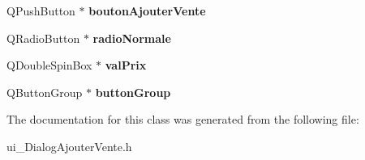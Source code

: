 \begin{DoxyCompactItemize}
\item 
Q\-Push\-Button $\ast$ {\bfseries bouton\-Ajouter\-Vente}\label{class_ui___dialog_ajouter_vente_a9b3dc0fa96393ccf69a41ae7776da8df}

\item 
Q\-Radio\-Button $\ast$ {\bfseries radio\-Normale}\label{class_ui___dialog_ajouter_vente_a4ec0099d5d75035625d2f104a6882acc}

\item 
Q\-Double\-Spin\-Box $\ast$ {\bfseries val\-Prix}\label{class_ui___dialog_ajouter_vente_a125862f438ab182a8a49357a91bb37ef}

\item 
Q\-Button\-Group $\ast$ {\bfseries button\-Group}\label{class_ui___dialog_ajouter_vente_a7814de48092bce095428664bda3373d3}

\end{DoxyCompactItemize}


The documentation for this class was generated from the following file\-:\begin{DoxyCompactItemize}
\item 
ui\-\_\-\-Dialog\-Ajouter\-Vente.\-h\end{DoxyCompactItemize}
